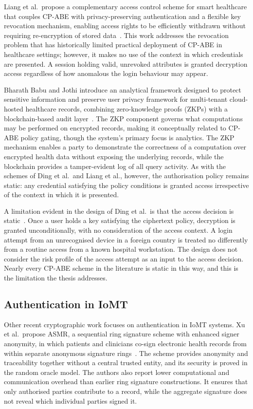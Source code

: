 Liang et al.\ propose a complementary access control scheme for smart healthcare that couples CP-ABE with privacy-preserving authentication and a flexible key revocation mechanism, enabling access rights to be efficiently withdrawn without requiring re-encryption of stored data~\cite{liang2024access}. This work addresses the revocation problem that has historically limited practical deployment of CP-ABE in healthcare settings; however, it makes no use of the context in which credentials are presented. A session holding valid, unrevoked attributes is granted decryption access regardless of how anomalous the login behaviour may appear.

Bharath Babu and Jothi introduce an analytical framework designed to protect sensitive information and preserve user privacy framework for multi-tenant cloud-hosted healthcare records, combining zero-knowledge proofs (ZKPs) with a blockchain-based audit layer~\cite{bharathbabu2025zkp}. The ZKP component governs what computations may be performed on encrypted records, making it conceptually related to CP-ABE policy gating, though the system's primary focus is analytics. The ZKP mechanism enables a party to demonstrate the correctness of a computation over encrypted health data without exposing the underlying records, while the blockchain provides a tamper-evident log of all query activity. As with the schemes of Ding et al.\ and Liang et al., however, the authorisation policy remains static: any credential satisfying the policy conditions is granted access irrespective of the context in which it is presented.

A limitation evident in the design of Ding et al.\ is that the access decision is static~\cite{ding2026badsabe}. Once a user holds a key satisfying the ciphertext policy, decryption is granted unconditionally, with no consideration of the access context. A login attempt from an unrecognised device in a foreign country is treated no differently from a routine access from a known hospital workstation. The design does not consider the risk profile of the access attempt as an input to the access decision. Nearly every CP-ABE scheme in the literature is static in this way, and this is the limitation the thesis addresses.

\subsection{Authentication in IoMT}
\label{sec:subsection_212}

Other recent cryptographic work focuses on authentication in IoMT systems. Xu et al.\ propose ASMR, a sequential ring signature scheme with enhanced signer anonymity, in which patients and clinicians co-sign electronic health records from within separate anonymous signature rings~\cite{xu2025asmr}. The scheme provides anonymity and traceability together without a central trusted entity, and its security is proved in the random oracle model. The authors also report lower computational and communication overhead than earlier ring signature constructions. It ensures that only authorised parties contribute to a record, while the aggregate signature does not reveal which individual parties signed it.

